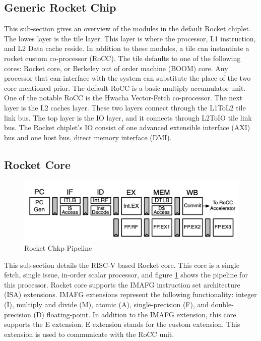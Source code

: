 \documentclass[../main.tex]{subfiles}
\begin{document}
\subsection{Generic Rocket Chip}
This sub-section gives an overview of the modules in the default Rocket chiplet. The lowes layer is the tile layer. This layer is where the processor,  L1 instruction, and L2 Data cache reside. In addition to these modules, a tile can instantiate a rocket custom co-processor (RoCC).  The tile defaults to one of the following cores: Rocket core, or Berkeley out of order machine (BOOM) core. Any processor that can interface with the system can substitute the place of the two core mentioned prior.  The default RoCC is a basic multiply accumulator unit. One of the notable RoCC is the Hwacha Vector-Fetch co-processor\cite{HwachaPaper}. The next layer is the L2 caches layer. These two layers connect through the L1ToL2 tile link bus. The top layer is the IO layer, and it connects through L2ToIO tile link bus. The Rocket chiplet's IO consist of one advanced extensible interface (AXI) bus and one host bus, direct memory interface (DMI). 



\subsection{Rocket Core}
\begin{figure}
    \centering
    \includegraphics[scale=.35]{pngs/RocketPipeline.png}
    \caption{Rocket Chkp Pipeline\cite{Asanović:EECS-2016-17}}
    \label{fig:RocketCipFlow}
\end{figure}
This sub-section details the RISC-V based Rocket core. This core is a single fetch, single issue, in-order scalar processor, and figure \ref{fig:RocketCipFlow} shows the pipeline for this processor. Rocket core supports the IMAFG instruction set architecture (ISA) extensions\cite{RISC-V-isa}. IMAFG extensions represent the following functionality: integer (I), multiply and divide (M), atomic (A), single-precision (F), and double-precision (D) floating-point\cite{RISC-V-isa}. In addition to the IMAFG extension, this core supports the E extension. E extension stands for the custom extension. This extension is used to communicate with the RoCC unit.
\end{document}
